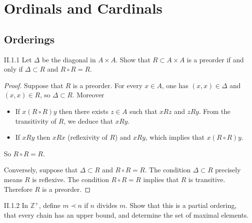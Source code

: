 \chapter{Ordinals and Cardinals}

\section{Orderings}

\begin{problem}{II.1.1}
Let \( \Delta \) be the diagonal in \( A\times A \). Show that \( R \subset A\times A \) is a preorder if and only if \( \Delta \subset R \) and \( R \circ R = R \).
\end{problem}

\begin{proof}
	Suppose that \( R \) is a preorder. For every \( x \in A \), one has \( (x, x) \in \Delta \) and \( (x, x) \in R \), so \( \Delta \subset R \). Moreover
	\begin{itemize}
		\item If \( x(R \circ R) y \) then there exists \( z \in A \)  such that \( xRz \) and \( zRy \). From the transitivity of \( R \), we deduce that \( xRy \).
		\item If \( xRy \) then \( xRx \) (reflexivity of \(R\)) and \( xRy \), which implies that \( x(R\circ R) y \).
	\end{itemize}

	So \( R \circ R = R \).

	Conversely, suppose that \( \Delta \subset R \) and \( R \circ R = R \). The condition \( \Delta \subset R \) precisely means \( R \) is reflexive. The condition \( R \circ R = R \) implies that \( R \) is transitive. Therefore \( R \) is a preorder.
\end{proof}

\begin{problem}{II.1.2}
In \( \mathbb{Z}^{+} \), define \( m \prec n \) if \( n \) divides \( m \). Show that this is a partial ordering, that every chain has an upper bound, and determine the set of maximal elements.
\end{problem}

